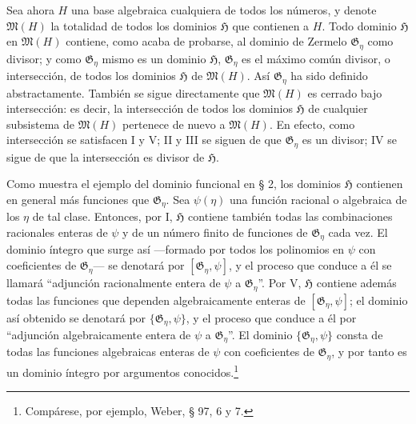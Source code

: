 Sea ahora $H$ una base algebraica cualquiera de todos los números, y denote $\mathfrak M(H)$ la totalidad de todos los dominios $\mathfrak H$ que contienen a $H$. Todo dominio $\mathfrak H$ en $\mathfrak M(H)$ contiene, como acaba de probarse, al dominio de Zermelo $\mathfrak G_\eta$ como divisor; y como $\mathfrak G_\eta$ mismo es un dominio $\mathfrak H$, $\mathfrak G_\eta$ es el máximo común divisor, o intersección, de todos los dominios $\mathfrak H$ de $\mathfrak M(H)$. Así $\mathfrak G_\eta$ ha sido definido abstractamente. También se sigue directamente que $\mathfrak M(H)$ es cerrado bajo intersección: es decir, la intersección de todos los dominios $\mathfrak H$ de cualquier subsistema de $\mathfrak M(H)$ pertenece de nuevo a $\mathfrak M(H)$. En efecto, como intersección se satisfacen I y V; II y III se siguen de que $\mathfrak G_\eta$ es un divisor; IV se sigue de que la intersección es divisor de $\mathfrak H$.

Como muestra el ejemplo del dominio funcional en § 2, los dominios $\mathfrak H$ contienen en general más funciones que $\mathfrak G_\eta$. Sea $\psi(\eta)$ una función racional o algebraica de los $\eta$ de tal clase. Entonces, por I, $\mathfrak H$ contiene también todas las combinaciones racionales enteras de $\psi$ y de un número finito de funciones de $\mathfrak G_\eta$ cada vez. El dominio íntegro que surge así ---formado por todos los polinomios en $\psi$ con coeficientes de $\mathfrak G_\eta$--- se denotará por $[\mathfrak G_\eta,\psi]$, y el proceso que conduce a él se llamará ``adjunción racionalmente entera de $\psi$ a $\mathfrak G_\eta$''. Por V, $\mathfrak H$ contiene además todas las funciones que dependen algebraicamente enteras de $[\mathfrak G_\eta,\psi]$; el dominio así obtenido se denotará por $\{\mathfrak G_\eta,\psi\}$, y el proceso que conduce a él por ``adjunción algebraicamente entera de $\psi$ a $\mathfrak G_\eta$''. El dominio $\{\mathfrak G_\eta,\psi\}$ consta de todas las funciones algebraicas enteras de $\psi$ con coeficientes de $\mathfrak G_\eta$, y por tanto es un dominio íntegro por argumentos conocidos.\footnote{Compárese, por ejemplo, Weber, § 97, 6 y 7.}


